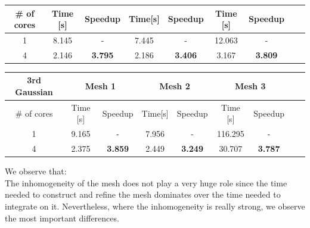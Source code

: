 \documentclass[8pt]{beamer}
\begin{document}
\begin{frame}
\begin{footnotesize}
\begin{center}
\begin{tabular}{|c|c|c|c|c|c|c|c|c|}
    \hline
    \# of cores & Time [s] & Speedup & Time[s] & Speedup & Time [s] & Speedup \\
    \hline
    1 & 8.145 & - & 7.445 & - & 12.063 & - \\
    4 & 2.146 & \textbf{3.795} & 2.186 & \textbf{3.406} & 3.167 & \textbf{3.809} \\
    \hline
\end{tabular}
\end{center}
\begin{center}
\begin{tabular}{|c|c|c|c|c|c|c|c|c|} 
   \hline
    \textbf{3rd Gaussian}& \multicolumn{2}{|c|}{Mesh 1} & \multicolumn{2}{|c|}{Mesh 2} & \multicolumn{2}{|c|}{Mesh 3}\\
    \hline
    \# of cores & Time [s] & Speedup & Time[s] & Speedup & Time [s] & Speedup \\
    \hline
    1 & 9.165 & - & 7.956 & - & 116.295 & - \\
    4 & 2.375 & \textbf{3.859} & 2.449 & \textbf{3.249} & 30.707 & \textbf{3.787} \\
    \hline
\end{tabular}
\end{center}
\end{footnotesize}
\end{frame}

\begin{frame}
\pause
We observe that:
\\

The inhomogeneity of the mesh does not play a very huge role since the time needed to construct and refine the mesh dominates over the time needed to integrate on it.
Nevertheless, where the inhomogeneity is really strong, we observe the most important differences.
\end{frame}
\end{document}
